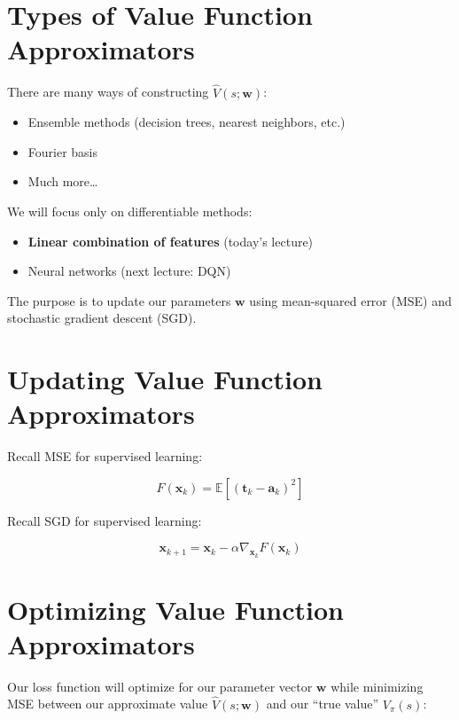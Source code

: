 \documentclass[
  letterpaper,
  DIV=11,
  numbers=noendperiod]{scrreprt}
\providecommand{\tightlist}{%
  \setlength{\itemsep}{0pt}\setlength{\parskip}{0pt}}\usepackage{longtable,booktabs,array}
\begin{document}
\section{Types of Value Function
Approximators}\label{types-of-value-function-approximators}

There are many ways of constructing \(\hat{V}(s; \mathbf{w})\):

\begin{itemize}
\tightlist
\item
  Ensemble methods (decision trees, nearest neighbors, etc.)
\item
  Fourier basis
\item
  Much more\ldots{}
\end{itemize}

We will focus only on differentiable methods:

\begin{itemize}
\tightlist
\item
  \textbf{Linear combination of features} (today's lecture)
\item
  Neural networks (next lecture: DQN)
\end{itemize}

The purpose is to update our parameters \(\mathbf{w}\) using
mean-squared error (MSE) and stochastic gradient descent (SGD).

\section{Updating Value Function
Approximators}\label{updating-value-function-approximators}

Recall MSE for supervised learning:

\[
F(\mathbf{x}_{k}) = \mathbb{E}[(\mathbf{t}_{k} - \mathbf{a}_{k})^2] 
\]

Recall SGD for supervised learning:

\[
\mathbf{x}_{k+1} = \mathbf{x}_{k} - \alpha \nabla_{\mathbf{x}_{k}} F(\mathbf{x}_{k})
\]

\section{Optimizing Value Function
Approximators}\label{optimizing-value-function-approximators}

Our loss function will optimize for our parameter vector \(\mathbf{w}\)
while minimizing MSE between our approximate value
\(\hat{V}(s; \mathbf{w})\) and our ``true value'' \(V_{\pi}(s)\):
\end{document}
